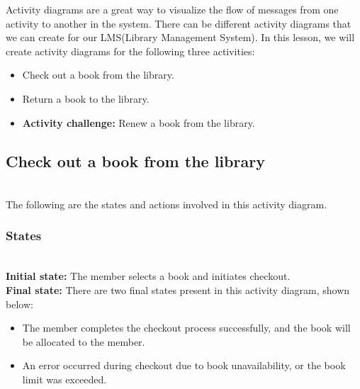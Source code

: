 

Activity diagrams are a great way to visualize the flow of messages from one activity to another in the system. There can be different activity diagrams that we can create for our LMS(Library Management System). In this lesson, we will create activity diagrams for the following three activities:

\begin{itemize}
\item
\protect{}\label{XjMxpaa4nrzIzEyBfb7xG}
Check out a book from the library.
\item
\protect{}\label{6ha9UjvexcOEWha8jIh83}
Return a book to the library.
\item
\protect{}\label{kVHkayzgJEjJeg6f-S5pQ}
\textbf{Activity challenge:} Renew a book from the library.
\end{itemize}

\subsection{Check out a book from the library}\label{c1z3pjkp2cfwqY1SwP0IL}
\\
The following are the states and actions involved in this activity diagram.

\subsubsection{States}\label{pH_MAFYDUiS35LNDrME4A}
\\
\textbf{Initial state:} The member selects a book and initiates checkout.
\\
\textbf{Final state:} There are two final states present in this activity diagram, shown below:

\begin{itemize}
\item
\protect{}\label{LENao63ZprXOMOwF0g-Ee}
The member completes the checkout process successfully, and the book will be allocated to the member.
\item
\protect{}\label{IPIkGEPjxjFPTV2GPF74r}
An error occurred during checkout due to book unavailability, or the book limit was exceeded.
\end{itemize}


